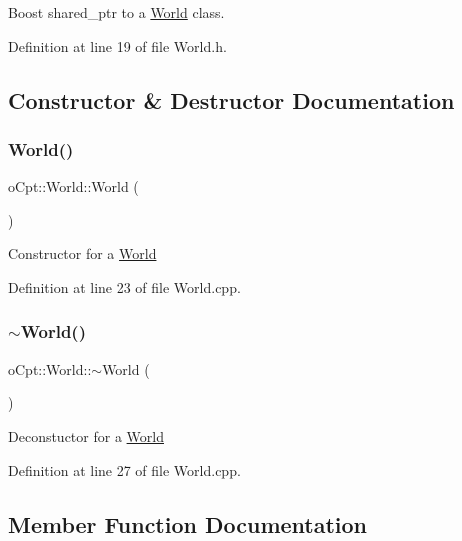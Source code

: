 Boost shared\+\_\+ptr to a \hyperlink{classo_cpt_1_1_world}{World} class. 



Definition at line 19 of file World.\+h.



\subsection{Constructor \& Destructor Documentation}
\hypertarget{classo_cpt_1_1_world_adc3d3e562ec4f5979b8da40bf8bef36c}{}\label{classo_cpt_1_1_world_adc3d3e562ec4f5979b8da40bf8bef36c} 
\subsubsection{\texorpdfstring{World()}{World()}}
{\footnotesize\ttfamily o\+Cpt\+::\+World\+::\+World (\begin{DoxyParamCaption}{ }\end{DoxyParamCaption})}

Constructor for a \hyperlink{classo_cpt_1_1_world}{World} 

Definition at line 23 of file World.\+cpp.

\hypertarget{classo_cpt_1_1_world_a74dd3c254805c7dd16353b7b7e93dc45}{}\label{classo_cpt_1_1_world_a74dd3c254805c7dd16353b7b7e93dc45} 
\subsubsection{\texorpdfstring{$\sim$\+World()}{~World()}}
{\footnotesize\ttfamily o\+Cpt\+::\+World\+::$\sim$\+World (\begin{DoxyParamCaption}{ }\end{DoxyParamCaption})\hspace{0.3cm}{\ttfamily [virtual]}}

Deconstuctor for a \hyperlink{classo_cpt_1_1_world}{World} 

Definition at line 27 of file World.\+cpp.



\subsection{Member Function Documentation}
\hypertarget{classo_cpt_1_1_world_a505f4c14270cfd34d806bd04c4b67f95}{}\label{classo_cpt_1_1_world_a505f4c14270cfd34d806bd04c4b67f95} 
